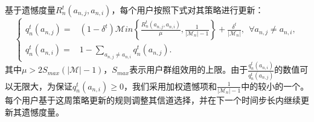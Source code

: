 基于遗憾度量$R_n^t(a_{n,j},a_{n,i})$，每个用户按照下式对其策略进行更新：
\vspace{-0.1cm}
\begin{equation}\label{eq:str2}
\begin{cases}
q^{t}_n(a_{n,j})=&(1-\delta^t)\mathcal{M}in\left\{\frac{R^t_n(a_{n,j},a_{n,i})}{\mu},\frac{1}{|\mathcal{M}_n|-1}\right\}+\frac{\delta^t}{|\mathcal{M}_n|}, ~~\forall a_{n,j}\neq a_{n,i}, \\
q^{t}_n(a_{n,i})=&1-\sum_{a_{n,j}\neq a_{n,i}}q^t_n(a_{n,j}).
\end{cases}
\end{equation}
其中$\mu>2S_{max}(|\mathcal{M}|-1)$，$S_{max}$表示用户群组效用的上限。由于$\frac{q^t_n(a_{n,i})}{q^t_n(a_{n,j})}$的数值可以无限大，为保证$q^{t}_n(a_{n,i})\geq0$，我们采用加权遗憾项和$\frac{1}{|\mathcal{M}_n|-1}$中的较小的一个。每个用户基于这周策略更新的规则调整其信道选择，并在下一个时间步长内继续更新其遗憾度量。

